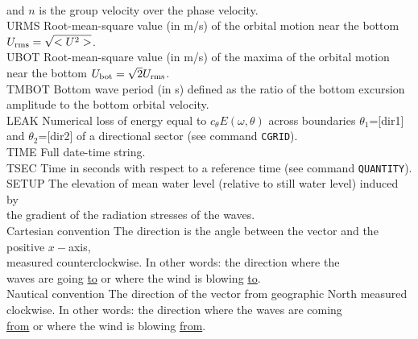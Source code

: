 \documentclass[12pt]{book}
\begin{document}
\begin{tabbing}
                        \\
                        and $n$ is the group velocity over the phase velocity.\-\\
URMS                 \> Root-mean-square value (in m/s) of the orbital motion near the bottom\+\\
                        $U_{\rm rms} = \sqrt{<U^2>}$.\-\\
UBOT                 \> Root-mean-square value (in m/s) of the maxima of the orbital motion\+\\
                        near the bottom $U_{\rm bot} = \sqrt{2} U_{\rm rms}$.\-\\
TMBOT                \> Bottom wave period (in s) defined as the ratio of the bottom excursion\+\\
                        amplitude to the bottom orbital velocity.\-\\
LEAK                 \> Numerical loss of energy equal to $c_{\theta}E(\omega,\theta)$ across boundaries $\theta_1$=[dir1]\+\\
                        and $\theta_2$=[dir2] of a directional sector (see command {\tt CGRID}).\-\\
TIME                 \> Full date-time string.\\
TSEC                 \> Time in seconds with respect to a reference time (see command {\tt QUANTITY}).\\
SETUP                \> The elevation of mean water level (relative to still water level) induced by\+\\
                        the gradient of the radiation stresses of the waves.\-\\
Cartesian convention \> The direction is the angle between the vector and the positive $x-$axis,\+\\
                        measured counterclockwise. In other words: the direction where the\\
                        waves are going {\underline {to}} or where the wind is blowing {\underline {to}}.\-\\
Nautical convention  \> The direction of the vector from geographic North measured\+\\
                        clockwise. In other words: the direction where the waves are coming\\
                        {\underline {from}} or where the wind is blowing {\underline {from}}.\-\\
\end{tabbing}
\end{document}
